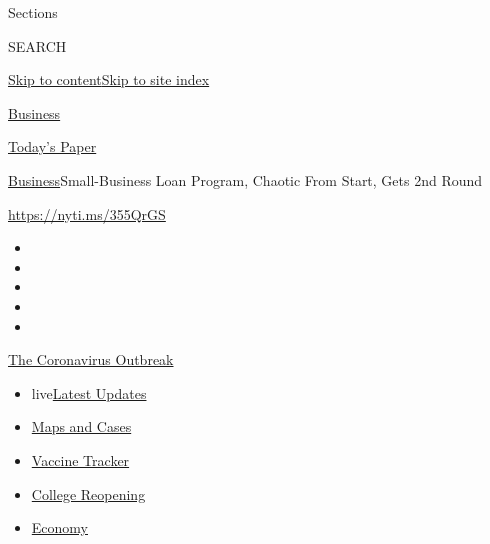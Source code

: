 Sections

SEARCH

\protect\hyperlink{site-content}{Skip to
content}\protect\hyperlink{site-index}{Skip to site index}

\href{https://www.nytimes.com/section/business}{Business}

\href{https://myaccount.nytimes.com/auth/login?response_type=cookie\&client_id=vi}{}

\href{https://www.nytimes.com/section/todayspaper}{Today's Paper}

\href{/section/business}{Business}\textbar{}Small-Business Loan Program,
Chaotic From Start, Gets 2nd Round

\url{https://nyti.ms/355QrGS}

\begin{itemize}
\item
\item
\item
\item
\item
\end{itemize}

\href{https://www.nytimes.com/news-event/coronavirus?action=click\&pgtype=Article\&state=default\&region=TOP_BANNER\&context=storylines_menu}{The
Coronavirus Outbreak}

\begin{itemize}
\tightlist
\item
  live\href{https://www.nytimes.com/2020/08/03/world/coronavirus-covid-19.html?action=click\&pgtype=Article\&state=default\&region=TOP_BANNER\&context=storylines_menu}{Latest
  Updates}
\item
  \href{https://www.nytimes.com/interactive/2020/us/coronavirus-us-cases.html?action=click\&pgtype=Article\&state=default\&region=TOP_BANNER\&context=storylines_menu}{Maps
  and Cases}
\item
  \href{https://www.nytimes.com/interactive/2020/science/coronavirus-vaccine-tracker.html?action=click\&pgtype=Article\&state=default\&region=TOP_BANNER\&context=storylines_menu}{Vaccine
  Tracker}
\item
  \href{https://www.nytimes.com/2020/08/02/us/covid-college-reopening.html?action=click\&pgtype=Article\&state=default\&region=TOP_BANNER\&context=storylines_menu}{College
  Reopening}
\item
  \href{https://www.nytimes.com/live/2020/08/03/business/stock-market-today-coronavirus?action=click\&pgtype=Article\&state=default\&region=TOP_BANNER\&context=storylines_menu}{Economy}
\end{itemize}

